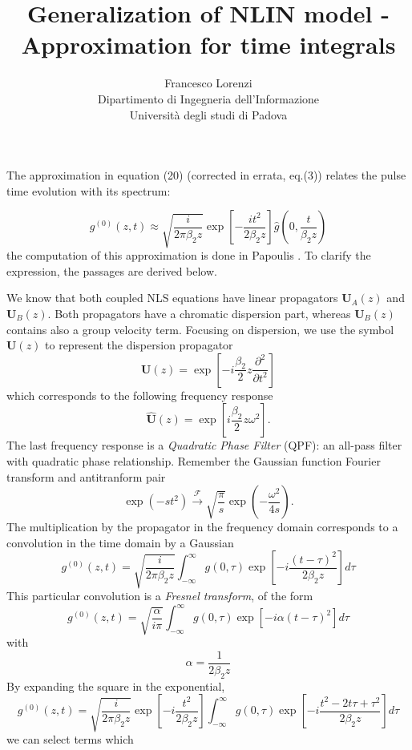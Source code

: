 \documentclass[10pt, lettersize, journal, onecolumn]{IEEEtran}
\title{Generalization of NLIN model - Approximation for time integrals}
\author{Francesco Lorenzi  \vspace{2pt}\\  {\footnotesize Dipartimento di Ingegneria dell'Informazione\\ \vspace{-5pt} Università degli studi di Padova}}
\begin{document}
	\maketitle
	The approximation in equation (20) (corrected in errata, eq.(3)) relates the pulse time evolution with its spectrum:

	\begin{equation}\label{eq:papoulis}
		g^{(0)}(z, t) \approx \sqrt{\frac{i}{2\pi \beta_2 z}} \exp\left[-\frac{it^2}{2 \beta_2 z}\right] \hat{g}\left(0, \frac{t}{\beta_2 z}\right)	
	\end{equation}
	the computation of this approximation is done in Papoulis \cite{Papoulis_1994}.
	To clarify the expression, the passages are derived below.
	
	We know that both coupled NLS equations have linear propagators $\mathbf{U}_A(z)$ and $\mathbf{U}_B(z)$. Both propagators have a chromatic dispersion part, whereas $\mathbf{U}_B(z)$ contains also a group velocity term. Focusing on dispersion, we use the symbol $\mathbf{U}(z)$ to represent the dispersion propagator
	\begin{equation}
		\mathbf{U}(z) = \exp\left[-i \dfrac{\beta_2}{2}z\dfrac{\partial^2}{\partial t^2} \right]
	\end{equation}
	which corresponds to the following frequency response 
	\begin{equation}
		\hat{\mathbf{U}}(z) = \exp\left[i \dfrac{\beta_2}{2}z\omega^2 \right].
	\end{equation}
	The last frequency response is a \textit{Quadratic Phase Filter} (QPF): an all-pass filter with quadratic phase relationship. 
	Remember the Gaussian function Fourier transform and antitranform pair
	\begin{equation}
		\exp (-st^2)  \xrightarrow{\mathcal{F}}  \sqrt{\dfrac{\pi}{s}}\exp\left(-\dfrac{\omega^2}{4 s}\right).
	\end{equation}
	The multiplication by the propagator in the frequency domain corresponds to a convolution in the time domain by a Gaussian
	\begin{equation}
		g^{(0)}(z, t) = \sqrt{\dfrac{i}{2\pi \beta_2 z}} \int_{-\infty}^{\infty}  g(0, \tau) \exp\left[-i\dfrac{(t-\tau)^2}{2\beta_2 z}  \right] d\tau
	\end{equation}
	This particular convolution is a \textit{Fresnel transform}, of the form
	\begin{equation}
		g^{(0)}(z, t) = \sqrt{\dfrac{\alpha}{i\pi}} \int_{-\infty}^{\infty}  g(0, \tau) \exp\left[-i \alpha(t-\tau)^2 \right] d\tau
	\end{equation}
	with
	\begin{equation}
		\alpha = \dfrac{1}{2 \beta_2 z} 
	\end{equation}
	By expanding the square in the exponential, 
	\begin{equation}
		g^{(0)}(z, t) = \sqrt{\dfrac{i}{2\pi \beta_2 z}} \exp\left[-i\dfrac{t^2}{2\beta_2 z}\right] \int_{-\infty}^{\infty}  g(0, \tau) \exp\left[-i\dfrac{t^2- 2t \tau +\tau^2}{2\beta_2 z}  \right] d\tau
	\end{equation}
	we can select terms which 
	
\end{document}
